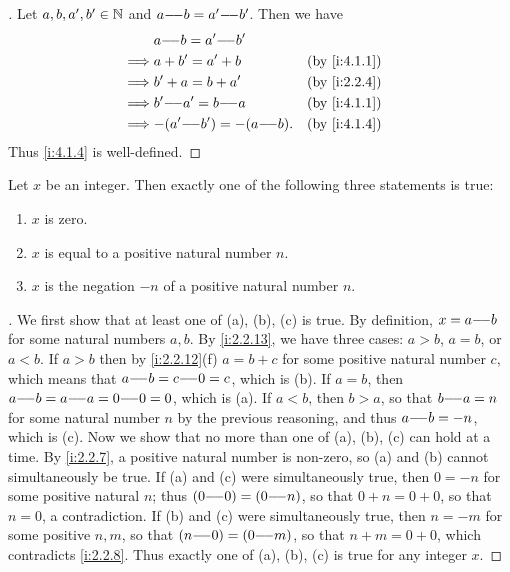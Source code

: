 \begin{proof}[]
  Let \(a, b, a', b' \in \mathbb{N}\) and \(a {-}\!{-} b = a' {-}\!{-} b'\).
  Then we have
  \begin{align*}
             & a \mm b = a' \mm b'                            \\
    \implies & a + b' = a' + b              &  & \by{i:4.1.1} \\
    \implies & b' + a = b + a'              &  & \by{i:2.2.4} \\
    \implies & b' \mm a' = b \mm a          &  & \by{i:4.1.1} \\
    \implies & {-}(a' \mm b') = -(a \mm b). &  & \by{i:4.1.4}
  \end{align*}
  Thus \cref{i:4.1.4} is well-defined.
\end{proof}

\begin{lem}\label{i:4.1.5}
  Let \(x\) be an integer.
  Then exactly one of the following three statements is true:
  \begin{enumerate}
    \item \(x\) is zero.
    \item \(x\) is equal to a positive natural number \(n\).
    \item \(x\) is the negation \(-n\) of a positive natural number \(n\).
  \end{enumerate}
\end{lem}

\begin{proof}[]
  We first show that at least one of (a), (b), (c) is true.
  By definition, \(x = a {-}\!{-} b\) for some natural numbers \(a, b\).
  By \cref{i:2.2.13}, we have three cases: \(a > b\), \(a = b\), or \(a < b\).
  If \(a > b\) then by \cref{i:2.2.12}(f) \(a = b + c\) for some positive natural number \(c\), which means that \(a {-}\!{-} b = c {-}\!{-} 0 = c\), which is (b).
  If \(a = b\), then \(a {-}\!{-} b = a {-}\!{-} a = 0 {-}\!{-} 0 = 0\), which is (a).
  If \(a < b\), then \(b > a\), so that \(b {-}\!{-} a = n\) for some natural number \(n\) by the previous reasoning, and thus \(a {-}\!{-} b = -n\), which is (c).
  Now we show that no more than one of (a), (b), (c) can hold at a time.
  By \cref{i:2.2.7}, a positive natural number is non-zero, so (a) and (b) cannot simultaneously be true.
  If (a) and (c) were simultaneously true, then \(0 = -n\) for some positive natural \(n\);
  thus \((0 {-}\!{-} 0) = (0 {-}\!{-} n)\), so that \(0 + n = 0 + 0\), so that \(n = 0\), a contradiction.
  If (b) and (c) were simultaneously true, then \(n = -m\) for some positive \(n, m\), so that \((n {-}\!{-} 0) = (0 {-}\!{-} m)\), so that \(n + m = 0 + 0\), which contradicts \cref{i:2.2.8}.
  Thus exactly one of (a), (b), (c) is true for any integer \(x\).
\end{proof}

